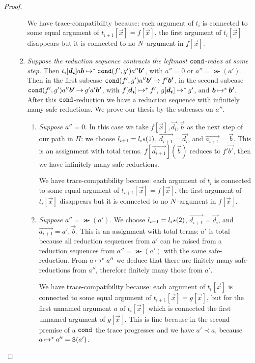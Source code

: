 \begin{proof}
\begin{enumerate}
\begin{enumerate}
  We have trace-compatibility because: 
  each argument of $t_i$ is connected to some equal argument of $t_{i+1}[\vec{x}]=f[\vec{x}]$,
  the first argument of $t_i[\vec{x}]$ disappears but it is connected to no ${N}$-argument in $f[\vec{x}]$.

\item
  \emph{Suppose the reduction sequence contracts the leftmost ${\tt cond}$-redex at some step.}
  Then $t_i[\vec{d_i}]a \vec{b} \reduces^{*} \cond(f',g')a''\vec{b'}$, with $a'' = 0$ or $a'' = \Succ(a')$. 
  Then in the first subcase $\cond(f',g')a''\vec{b'} \reduces f'\vec{b'}$, in the second subcase
  $\cond(f',g')a''\vec{b'} \reduces g' a' \vec{b'}$, 
  with $f[\vec{d_i}] \reduces^{*} f'$, $g[\vec{d_i}] \reduces^{*} g'$, and $\vec{b} \reduces^{*} \vec{b'}$.
  After this ${\tt cond}$-reduction we have a reduction sequence with infinitely many safe reductions.
  We prove our thesis by the subcases on $a''$.
   

\begin{enumerate}
\item
  \emph{Suppose $a'' = 0$}.
   In this case we take $f[\vec{x}],\vec{d_i},\vec{b}$ as the next step of our path in $\Pi$:
  we choose $l_{i+1} = l_i {\star} (1)$, $\vec{d_{i+1}} = \vec{d_i}$, and $\vec{a_{i+1}} = \vec{b}$. 
  This is an assignment with total terms.
  $f[\vec{d_{i+1}}](\vec{b})$ reduces to $f' \vec{b'}$, then we have infinitely many safe reductions.

  We have trace-compatibility because: 
    each argument of $t_i$ is connected to some equal argument of $t_{i+1}[\vec{x}]=f[\vec{x}]$,
    the first argument of $t_i[\vec{x}]$ disappears but it is connected to no ${N}$-argument in $f[\vec{x}]$.

 \item
  \emph{Suppose $a'' = \Succ(a')$}. 
  We choose $l_{i+1} = l_i {\star} (2)$, $\vec{d_{i+1}} = \vec{d_i}$, and
  $\vec{a_{i+1}} = a',\vec{b}$. This is an assignment with total terms: $a'$ is total because
  all reduction sequences from $a'$ can be raised from a reduction sequences from $a'' = \Succ(a')$
  with the same safe-reduction. From $a \mathbin{\mapsto}^{*} a''$ we deduce that
  there are finitely many safe-reductions from $a''$, therefore finitely many those from $a'$.
 
  We have trace-compatibility because: 
  each argument of $t_i[\vec{x}]$ is connected to some equal argument of 
    $t_{i+1}[\vec{x}]=g[\vec{x}]$,
    but for the first unnamed argument $a$ of $t_i[\vec{x}]$ 
    which is connected the first unnamed argument of $g[\vec{x}]$.
    This is fine because in the second premise of a ${\tt cond}$ 
    the trace progresses and we have $a' \prec a$, because $a \mathbin{\mapsto}^{*}  a'' = {\tt S}(a')$.


\end{enumerate}
\end{enumerate}
\end{enumerate}
\end{proof}
